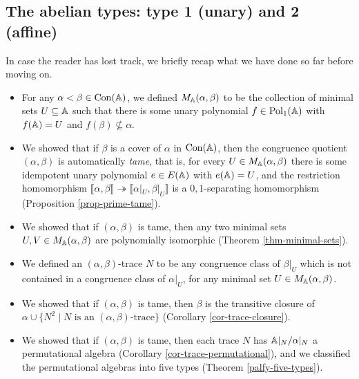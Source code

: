 \begin{appendices}


\section{The abelian types: type \textbf{1} (unary) and \textbf{2} (affine)}

In case the reader has lost track, we briefly recap what we have done so far before moving on.
\begin{itemize}
\item For any $\alpha < \beta \in \operatorname{Con}(\mathbb{A})$, we defined $M_{\mathbb{A}}(\alpha, \beta)$ to be the collection of minimal sets $U \subseteq \mathbb{A}$ such that there is some unary polynomial $f \in \operatorname{Pol}_1(\mathbb{A})$ with $f(\mathbb{A}) = U$ and $f(\beta) \not\subseteq \alpha$.

\item We showed that if $\beta$ is a cover of $\alpha$ in $\operatorname{Con}(\mathbb{A})$, then the congruence quotient $(\alpha, \beta)$ is automatically \emph{tame}, that is, for every $U \in M_{\mathbb{A}}(\alpha, \beta)$ there is some idempotent unary polynomial $e \in E(\mathbb{A})$ with $e(\mathbb{A}) = U$, and the restriction homomorphism $\llbracket \alpha, \beta \rrbracket \twoheadrightarrow \llbracket \alpha|_U, \beta|_U \rrbracket$ is a $0,1$-separating homomorphism (Proposition \ref{prop-prime-tame}).

\item We showed that if $(\alpha, \beta)$ is tame, then any two minimal sets $U, V \in M_{\mathbb{A}}(\alpha, \beta)$ are polynomially isomorphic (Theorem \ref{thm-minimal-sets}).

\item We defined an $(\alpha, \beta)$-trace $N$ to be any congruence class of $\beta|_U$ which is not contained in a congruence class of $\alpha|_U$, for any minimal set $U \in M_{\mathbb{A}}(\alpha, \beta)$.

\item We showed that if $(\alpha, \beta)$ is tame, then $\beta$ is the transitive closure of $\alpha \cup \{N^2 \mid N \text{ is an }(\alpha,\beta)\text{-trace}\}$ (Corollary \ref{cor-trace-closure}).

\item We showed that if $(\alpha, \beta)$ is tame, then each trace $N$ has $\mathbb{A}|_N / \alpha|_N$ a permutational algebra (Corollary \ref{cor-trace-permutational}), and we classified the permutational algebras into five types (Theorem \ref{palfy-five-types}).


\end{itemize}
\end{appendices}
